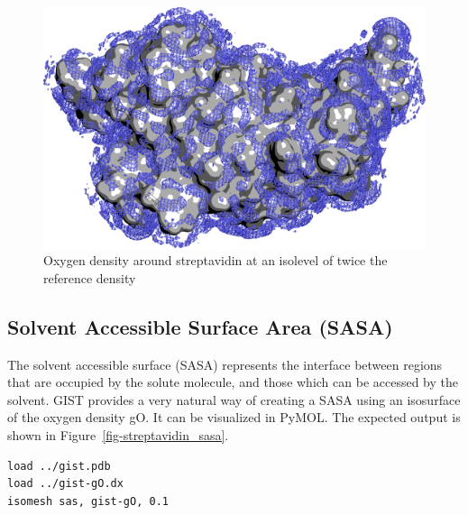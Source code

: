 \documentclass[9pt,tutorial]{livecoms}
\begin{document}
\begin{figure}
	\centering
	\includegraphics[width=1.0\linewidth]{figures/streptavidin_gO_high_surf.png}
	\caption{Oxygen density around streptavidin at an isolevel of twice the reference density}\label{fig-streptavidin_gO}
\end{figure}

\subsection{Solvent Accessible Surface Area (SASA)}

The solvent accessible surface (SASA) represents the interface between regions that are occupied by the solute molecule, and those which can be accessed by the solvent.
GIST provides a very natural way of creating a SASA using an isosurface of the oxygen density gO.
It can be visualized in PyMOL.
The expected output is shown in Figure~\ref{fig-streptavidin_sasa}.

\begin{lstlisting}[style=pymol]
load ../gist.pdb
load ../gist-gO.dx
isomesh sas, gist-gO, 0.1
\end{lstlisting}
\end{document}
